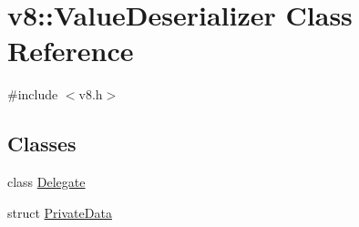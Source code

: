 \hypertarget{classv8_1_1ValueDeserializer}{}\section{v8\+:\+:Value\+Deserializer Class Reference}
\label{classv8_1_1ValueDeserializer}


{\ttfamily \#include $<$v8.\+h$>$}

\subsection*{Classes}
\begin{DoxyCompactItemize}
\item 
class \mbox{\hyperlink{classv8_1_1ValueDeserializer_1_1Delegate}{Delegate}}
\item 
struct \mbox{\hyperlink{structv8_1_1ValueDeserializer_1_1PrivateData}{Private\+Data}}
\end{DoxyCompactItemize}
